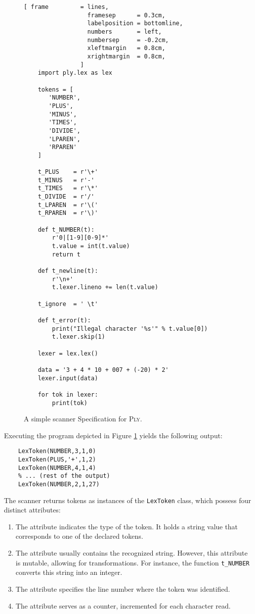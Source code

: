 \begin{figure}[!ht]
\centering
\begin{Verbatim}[ frame         = lines, 
                  framesep      = 0.3cm, 
                  labelposition = bottomline,
                  numbers       = left,
                  numbersep     = -0.2cm,
                  xleftmargin   = 0.8cm,
                  xrightmargin  = 0.8cm,
                ]
    import ply.lex as lex
    
    tokens = [
       'NUMBER',
       'PLUS',
       'MINUS',
       'TIMES',
       'DIVIDE',
       'LPAREN',
       'RPAREN'
    ]
    
    t_PLUS    = r'\+'
    t_MINUS   = r'-'
    t_TIMES   = r'\*'
    t_DIVIDE  = r'/'
    t_LPAREN  = r'\('
    t_RPAREN  = r'\)'
    
    def t_NUMBER(t):
        r'0|[1-9][0-9]*'
        t.value = int(t.value)
        return t
    
    def t_newline(t):
        r'\n+'
        t.lexer.lineno += len(t.value)
    
    t_ignore  = ' \t'
    
    def t_error(t):
        print("Illegal character '%s'" % t.value[0])
        t.lexer.skip(1)
    
    lexer = lex.lex()
    
    data = '3 + 4 * 10 + 007 + (-20) * 2'
    lexer.input(data)
    
    for tok in lexer:
        print(tok)
\end{Verbatim}
\vspace*{-0.3cm}
\caption{A simple scanner Specification for \textsc{Ply}.}
\label{fig:Ply-Example.ipynb}
\end{figure}

\noindent
Executing the program depicted in Figure \ref{fig:Ply-Example.ipynb} yields the following output:

\begin{verbatim}
    LexToken(NUMBER,3,1,0)
    LexToken(PLUS,'+',1,2)
    LexToken(NUMBER,4,1,4)
    % ... (rest of the output)
    LexToken(NUMBER,2,1,27)
\end{verbatim}
The scanner returns tokens as instances of the \texttt{LexToken} class, which possess four distinct attributes:
\begin{enumerate}
\item The  attribute indicates the type of the token. It holds a string value that
      corresponds to one of the declared tokens. 
\item The  attribute usually contains the recognized string. However, this attribute is
      mutable, allowing for transformations. For instance, the function \texttt{t\_NUMBER} converts this string
      into an integer. 
\item The  attribute specifies the line number where the token was identified.
\item The  attribute serves as a counter, incremented for each character read.
\end{enumerate}

